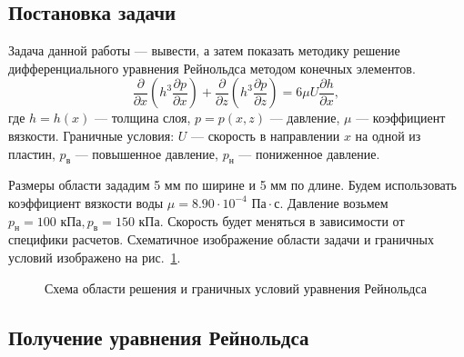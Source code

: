 \documentclass[a4paper,14pt]{extarticle}
\begin{document}
\subsection{Постановка задачи}
Задача данной работы --- вывести, а затем показать методику решение дифференциального уравнения Рейнольдса методом конечных элементов.
\begin{equation}
	\label{reinolts-task}
\frac{\partial}{\partial x} \left(h^3 \frac{\partial p}{\partial x} \right) + \frac{\partial}{\partial z} \left(h^3 \frac{\partial p}{\partial z} \right) = 6 \mu U \frac{\partial h}{\partial x} \text{, }
\end{equation}
где $h = h(x)$ --- толщина слоя, $p = p(x, z)$ --- давление, $\mu$ --- коэффициент вязкости. Граничные условия: $U$ --- скорость в направлении $x$ на одной из пластин, $p_{\text{в}}$ --- повышенное давление, $p_{\text{н}}$ --- пониженное давление. 

Размеры области зададим 5 мм по ширине и 5 мм по длине. Будем использовать коэффициент вязкости воды $\mu = 8.90 \cdot 10^{-4} \text{ Па} \cdot \text{с}$.
\newline Давление возьмем $p_{\text{н}} = 100 \text{ кПа}, p_{\text{в}} = 150 \text{ кПа}$. Скорость будет меняться в зависимости от специфики расчетов. Схематичное изображение области задачи и граничных условий изображено на рис.~\ref{obl_resh}.

\begin{figure}[!htbp]
	\caption{Схема области решения и граничных условий уравнения Рейнольдса}
	\label{obl_resh}
\end{figure}

\subsection{Получение уравнения Рейнольдса}
\end{document}

